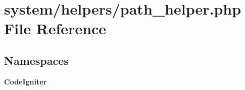 \section{system/helpers/path\-\_\-helper.php File Reference}
\label{path__helper_8php}
\subsection*{Namespaces}
\begin{DoxyCompactItemize}
\item 
{\bf Code\-Igniter}
\end{DoxyCompactItemize}
